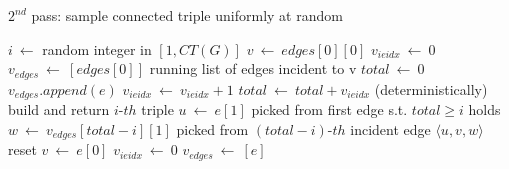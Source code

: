\vspace{-0.5cm}

\begin{algorithm}
	\caption{$2^{nd}$ pass: sample connected triple uniformly at random}
	\begin{algorithmic}[1]
		\State $i \ \leftarrow$ random integer in $[1, CT(G)]$
		\State $v \ \leftarrow \ edges[0][0]$
		\State $v_{ieidx} \ \leftarrow \ 0$
		\State $v_{edges} \ \leftarrow \ [edges[0]]$ \Comment running list of edges incident to v
		\State $total \ \leftarrow \ 0$
				\State $v_{edges}.append(e)$
				\State $v_{ieidx} \ \leftarrow \ v_{ieidx} + 1$
				\State $total \ \leftarrow \ total + v_{ieidx}$
				 \Comment (deterministically) build and return $i\text{-}th$ triple
					\State $u \ \leftarrow \ e[1]$ \Comment picked from first edge s.t. $total \ge i$ holds
					\State $w \ \leftarrow \ v_{edges}[total-i][1]$ \Comment picked from $(total-i)\text{-}th$ incident edge
					\State \Return $\langle u,v,w \rangle$
				\EndIf
			\Else \Comment reset
				\State $v \ \leftarrow \ e[0]$
				\State $v_{ieidx} \ \leftarrow \ 0$
				\State $v_{edges} \ \leftarrow \ [e]$
			\EndIf
		\EndFor
	\end{algorithmic}
\end{algorithm}
